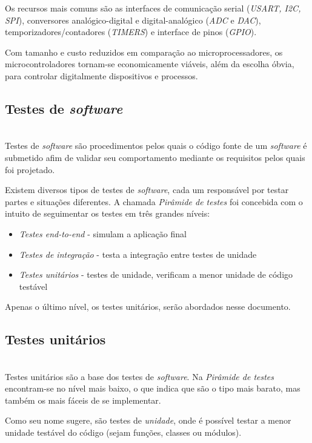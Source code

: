 \documentclass[times, twoside, watermark]{artigo}
\begin{document}
Os recursos mais comuns são as interfaces de comunicação 
serial (\textit{USART, I2C, SPI}), conversores analógico-digital e digital-analógico 
(\textit{ADC} e \textit{DAC}), temporizadores/contadores (\textit{TIMERS}) e 
interface de pinos (\textit{GPIO}).

Com tamanho e custo reduzidos em comparação ao microprocessadores,
os microcontroladores tornam-se economicamente viáveis, além da
escolha óbvia, para controlar digitalmente dispositivos e processos\cite{gridling2007introduction}.

\subsection{Testes de \textit{software}}\hfill\\

Testes de \textit{software} são procedimentos pelos quais o código fonte de um
\textit{software} é submetido afim de validar seu comportamento mediante
os requisitos pelos quais foi projetado.

Existem diversos tipos de testes de \textit{software}, cada um responsável por 
testar partes e situações diferentes. A chamada \textit{Pirâmide de testes}
\cite{contan2018test} foi concebida com o intuito de seguimentar os testes em três 
grandes níveis:

\begin{itemize}
\item \textit{Testes end-to-end} - simulam a aplicação final
\item \textit{Testes de integração} - testa a integração entre testes de unidade
\item \textit{Testes unitários} - testes de unidade, verificam a menor unidade de código testável
\end{itemize}

Apenas o último nível, os testes unitários, serão abordados nesse documento.

\subsection{Testes unitários}\hfill\\

Testes unitários são a base dos testes de \textit{software}. Na \textit{Pirâmide de 
testes} encontram-se no nível mais baixo, o que indica que são 
o tipo mais barato, mas também os mais fáceis de se 
implementar\cite{contan2018test}.

Como seu nome sugere, são testes de \textit{unidade}, onde é possível testar a 
menor unidade testável do código (sejam funções, classes ou módulos).
\end{document}
